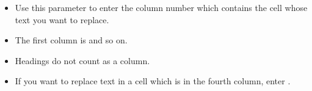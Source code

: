 \begin{itemize}
\item Use this parameter to enter the column number which contains the cell whose text you want to replace.
\item The first column is  and so on.
\item Headings do not count as a column.
\item If you want to replace text in a cell which is in the fourth column, enter . 

\end{itemize}

